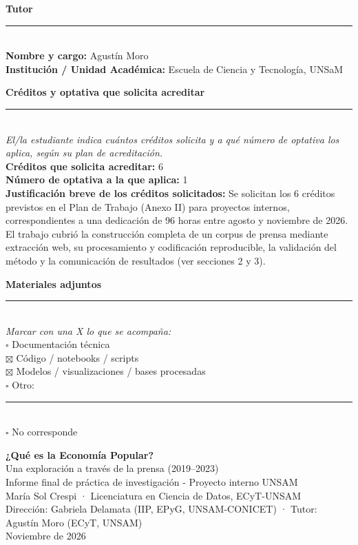 \documentclass[11pt,a4paper]{article}
\begin{document}
{\vspace{0.35em}
\noindent\textbf{Tutor}\\[-0.4em]
\rule{\linewidth}{0.4pt}\\
\textbf{Nombre y cargo:} Agustín Moro\\
\textbf{Institución / Unidad Académica:} Escuela de Ciencia y Tecnología, UNSaM

\vspace{0.35em}
\noindent\textbf{Créditos y optativa que solicita acreditar}\\[-0.4em]
\rule{\linewidth}{0.4pt}\\
\textit{El/la estudiante indica cuántos créditos solicita y a qué número de optativa los aplica, según su plan de acreditación.}\\
\textbf{Créditos que solicita acreditar:} 6\\
\textbf{Número de optativa a la que aplica:} 1\\
\textbf{Justificación breve de los créditos solicitados:} Se solicitan los 6 créditos previstos en el Plan de Trabajo (Anexo II) para proyectos internos, correspondientes a una dedicación de 96 horas entre agosto y noviembre de 2026. El trabajo cubrió la construcción completa de un corpus de prensa mediante extracción web, su procesamiento y codificación reproducible, la validación del método y la comunicación de resultados (ver secciones 2 y 3).

\vspace{0.35em}
\noindent\textbf{Materiales adjuntos}\\[-0.4em]
\rule{\linewidth}{0.4pt}\\
\textit{Marcar con una X lo que se acompaña:}\\
$\square$\; Documentación técnica\\
$\boxtimes$\; Código / notebooks / scripts\\
$\boxtimes$\; Modelos / visualizaciones / bases procesadas\\
$\square$\; Otro: \rule{6cm}{0.4pt}\\
$\square$\; No corresponde
}
\newpage
\setcounter{page}{1}

\begin{center}
  {\LARGE\bfseries ¿Qué es la Economía Popular?}\\[0.3em]
  {\large Una exploración a través de la prensa (2019--2023)}\\[0.8em]
  {\normalsize Informe final de práctica de investigación - Proyecto interno UNSAM}\\[0.2em]
  {\normalsize María Sol Crespi · Licenciatura en Ciencia de Datos, ECyT-UNSAM}\\[0.2em]
  {\small Dirección: Gabriela Delamata (IIP, EPyG, UNSAM-CONICET) · Tutor: Agustín Moro (ECyT, UNSAM)}\\[0.2em]
  {\small Noviembre de 2026}
\end{center}
\end{document}
